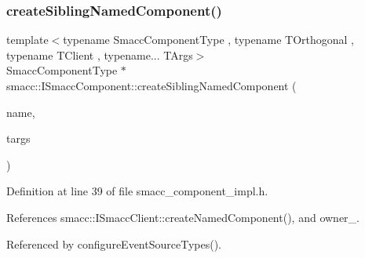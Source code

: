 \subsubsection{\texorpdfstring{create\+Sibling\+Named\+Component()}{createSiblingNamedComponent()}}
{\footnotesize\ttfamily template$<$typename Smacc\+Component\+Type , typename T\+Orthogonal , typename T\+Client , typename... T\+Args$>$ \\
Smacc\+Component\+Type $\ast$ smacc\+::\+I\+Smacc\+Component\+::create\+Sibling\+Named\+Component (\begin{DoxyParamCaption}\item[{std\+::string}]{name,  }\item[{T\+Args...}]{targs }\end{DoxyParamCaption})\hspace{0.3cm}{\ttfamily [protected]}}



Definition at line 39 of file smacc\+\_\+component\+\_\+impl.\+h.



References smacc\+::\+I\+Smacc\+Client\+::create\+Named\+Component(), and owner\+\_\+.



Referenced by configure\+Event\+Source\+Types().


